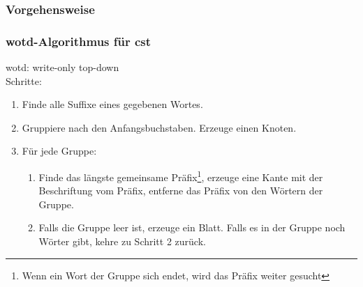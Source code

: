 \documentclass{beamer}
\begin{document}
\begin{frame}[t]
\begin{figure}
\end{figure}
\end{frame}

\subsubsection{Vorgehensweise}

\begin{frame}[t]
\frametitle{wotd-Algorithmus für cst}
wotd: write-only top-down\\
\medskip
Schritte:
\begin{enumerate}
    \item Finde alle Suffixe eines gegebenen Wortes.
    \item Gruppiere nach den Anfangsbuchstaben. Erzeuge einen Knoten.
    \item Für jede Gruppe:
    \begin{enumerate}
        \item Finde das längste gemeinsame Präfix\footnote{Wenn ein Wort der Gruppe sich endet, wird das Präfix weiter gesucht}, erzeuge eine Kante mit der Beschriftung vom Präfix, entferne das Präfix von den Wörtern der Gruppe.
        \item Falls die Gruppe leer ist, erzeuge ein Blatt. Falls es in der Gruppe noch Wörter gibt, kehre zu Schritt 2 zurück.
    \end{enumerate}
\end{enumerate}
\end{frame}
\end{document}
